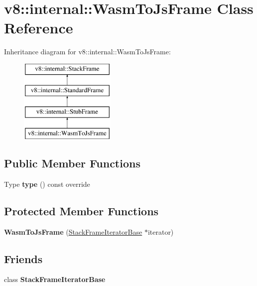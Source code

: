 \hypertarget{classv8_1_1internal_1_1WasmToJsFrame}{}\section{v8\+:\+:internal\+:\+:Wasm\+To\+Js\+Frame Class Reference}
\label{classv8_1_1internal_1_1WasmToJsFrame}
Inheritance diagram for v8\+:\+:internal\+:\+:Wasm\+To\+Js\+Frame\+:\begin{figure}[H]
\begin{center}
\leavevmode
\includegraphics[height=4.000000cm]{classv8_1_1internal_1_1WasmToJsFrame}
\end{center}
\end{figure}
\subsection*{Public Member Functions}
\begin{DoxyCompactItemize}
\item 
\mbox{\label{classv8_1_1internal_1_1WasmToJsFrame_add5b21255a2631b7cf4c5ec6f705d847}} 
Type {\bfseries type} () const override
\end{DoxyCompactItemize}
\subsection*{Protected Member Functions}
\begin{DoxyCompactItemize}
\item 
\mbox{\label{classv8_1_1internal_1_1WasmToJsFrame_a8ab84dfa559464ea3f0d728bd1fff083}} 
{\bfseries Wasm\+To\+Js\+Frame} (\mbox{\hyperlink{classv8_1_1internal_1_1StackFrameIteratorBase}{Stack\+Frame\+Iterator\+Base}} $\ast$iterator)
\end{DoxyCompactItemize}
\subsection*{Friends}
\begin{DoxyCompactItemize}
\item 
\mbox{\label{classv8_1_1internal_1_1WasmToJsFrame_ac7310421866976ca454bbe11c5f926c3}} 
class {\bfseries Stack\+Frame\+Iterator\+Base}
\end{DoxyCompactItemize}
